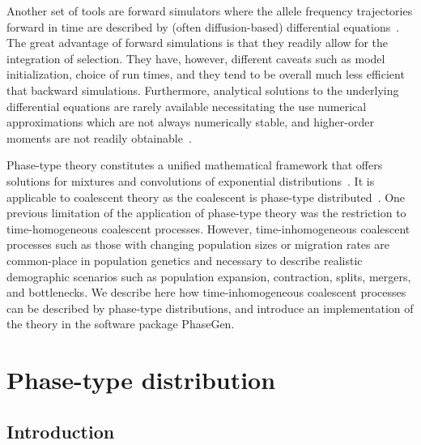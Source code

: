 \documentclass[hidelinks,11pt]{article}
\begin{document}
    Another set of tools are forward simulators where the allele frequency trajectories forward in time are described by (often diffusion-based) differential equations~\citep{dadi,moments}.
    The great advantage of forward simulations is that they readily allow for the integration of selection.
    They have, however, different caveats such as model initialization, choice of run times, and they tend to be overall much less efficient that backward simulations. %
    Furthermore, analytical solutions to the underlying differential equations are rarely available necessitating the use numerical approximations which are not always numerically stable, and higher-order moments are not readily obtainable~\citep{moments}. %

    Phase-type theory constitutes a unified mathematical framework that offers solutions for mixtures and convolutions of exponential distributions~\citep{phasetype}.
    It is applicable to coalescent theory as the coalescent is phase-type distributed~\citep{phasetype_popgen}.
    One previous limitation of the application of phase-type theory was the restriction to time-homogeneous coalescent processes. %
    However, time-inhomogeneous coalescent processes such as those with changing population sizes or migration rates are common-place in population genetics and necessary to describe realistic demographic scenarios such as population expansion, contraction, splits, mergers, and bottlenecks.
    We describe here how time-inhomogeneous coalescent processes can be described by phase-type distributions, and introduce an implementation of the theory in the software package PhaseGen.


    \section{Phase-type distribution}\label{sec:phase-type-distribution}


    \subsection{Introduction}\label{subsec:introduction}
\end{document}
